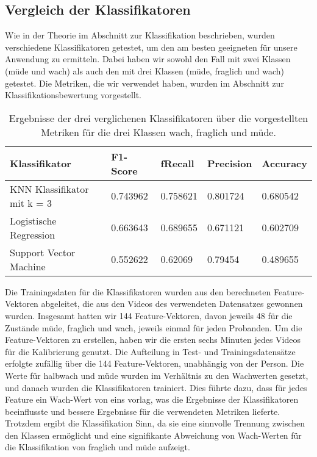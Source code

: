 \subsection{Vergleich der Klassifikatoren}
\label{subsec:classificatorcomparison}
Wie in der Theorie im Abschnitt zur Klassifikation beschrieben, wurden verschiedene Klassifikatoren getestet, um den am besten geeigneten für unsere Anwendung zu ermitteln. Dabei haben wir sowohl den Fall mit zwei Klassen (müde und wach) als auch den mit drei Klassen (müde, fraglich und wach) getestet. Die Metriken, die wir verwendet haben, wurden im Abschnitt zur Klassifikationsbewertung vorgestellt.

\begin{table}
    \centering
    \begin{tabular}{|l|l|l|l|l|}
    \hline
        {Klassifikator} & {F1-Score} & f{Recall} & {Precision} & {Accuracy} \\ \hline
        {KNN Klassifikator mit k = 3} & 0.743962 & 0.758621 & 0.801724 & 0.680542 \\ \hline
        {Logistische Regression} & 0.663643 & 0.689655 & 0.671121 & 0.602709 \\ \hline
        {Support Vector Machine} & 0.552622 & 0.62069 & 0.79454 & 0.489655 \\ \hline
    \end{tabular}
\caption{Ergebnisse der drei verglichenen Klassifikatoren über die vorgestellten Metriken für die drei Klassen wach, fraglich und müde.}
\label{table:threeclassificator}
\end{table}

Die Trainingsdaten für die Klassifikatoren wurden aus den berechneten Feature-Vektoren abgeleitet, die aus den Videos des verwendeten Datensatzes gewonnen wurden. Insgesamt hatten wir 144 Feature-Vektoren, davon jeweils 48 für die Zustände müde, fraglich und wach, jeweils einmal für jeden Probanden. Um die Feature-Vektoren zu erstellen, haben wir die ersten sechs Minuten jedes Videos für die Kalibrierung genutzt. Die Aufteilung in Test- und Trainingsdatensätze erfolgte zufällig über die 144 Feature-Vektoren, unabhängig von der Person. Die Werte für halbwach und müde wurden im Verhältnis zu den Wachwerten gesetzt, und danach wurden die Klassifikatoren trainiert. Dies führte dazu, dass für jedes Feature ein Wach-Wert von eins vorlag, was die Ergebnisse der Klassifikatoren beeinflusste und bessere Ergebnisse für die verwendeten Metriken lieferte. Trotzdem ergibt die Klassifikation Sinn, da sie eine sinnvolle Trennung zwischen den Klassen ermöglicht und eine signifikante Abweichung von Wach-Werten für die Klassifikation von fraglich und müde aufzeigt.

